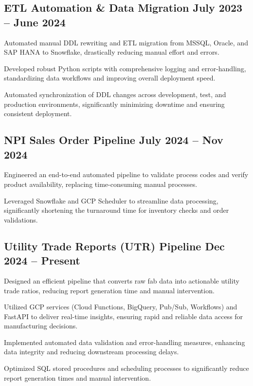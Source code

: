 \subsection{{ETL Automation \& Data Migration \hfill July 2023 -- June 2024}}
\begin{zitemize}
\item Automated manual DDL rewriting and ETL migration from MSSQL, Oracle, and SAP HANA to Snowflake, drastically reducing manual effort and errors.
\item Developed robust Python scripts with comprehensive logging and error-handling, standardizing data workflows and improving overall deployment speed.
\item Automated synchronization of DDL changes across development, test, and production environments, significantly minimizing downtime and ensuring consistent deployment.
\end{zitemize}

\subsection{{NPI Sales Order Pipeline \hfill July 2024 -- Nov 2024}}
\begin{zitemize}
\item Engineered an end-to-end automated pipeline to validate process codes and verify product availability, replacing time-consuming manual processes.
\item Leveraged Snowflake and GCP Scheduler to streamline data processing, significantly shortening the turnaround time for inventory checks and order validations.
\end{zitemize}

\subsection{{Utility Trade Reports (UTR) Pipeline \hfill Dec 2024 -- Present}}
\begin{zitemize}
\item Designed an efficient pipeline that converts raw fab data into actionable utility trade ratios, reducing report generation time and manual intervention.
\item Utilized GCP services (Cloud Functions, BigQuery, Pub/Sub, Workflows) and FastAPI to deliver real-time insights, ensuring rapid and reliable data access for manufacturing decisions.
\item Implemented automated data validation and error-handling measures, enhancing data integrity and reducing downstream processing delays.
\item Optimized SQL stored procedures and scheduling processes to significantly reduce report generation times and manual intervention.
\end{zitemize}

